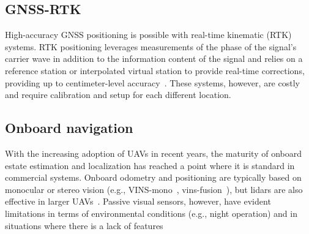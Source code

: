 \subsection{GNSS-RTK}
High-accuracy GNSS positioning is possible with real-time kinematic (RTK) systems. RTK positioning leverages measurements of the phase of the signal's carrier wave in addition to the information content of the signal and relies on a reference station or interpolated virtual station to provide real-time corrections, providing up to centimeter-level accuracy~\cite{tomavstik2019uav}. These systems, however, are costly and require calibration and setup for each different location.

\subsection{Onboard navigation}

With the increasing adoption of UAVs in recent years, the maturity of onboard estate estimation and localization has reached a point where it is standard in commercial systems. Onboard odometry and positioning are typically based on monocular or stereo vision (e.g., VINS-mono~\cite{qin2018vins}, vins-fusion~\cite{qin2019general}), but lidars are also effective in larger UAVs~\cite{zhang2019maximum}. Passive visual sensors, however, have evident limitations in terms of environmental conditions (e.g., night operation) and in situations where there is a lack of features~\cite{xiao2017uav, qingqing2020towards}

